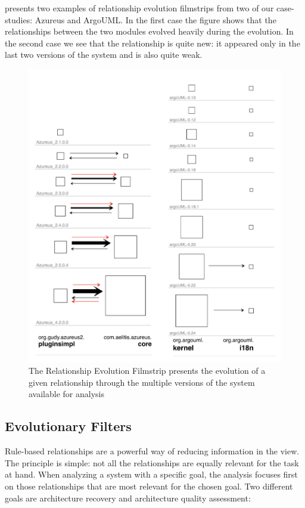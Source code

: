 \documentclass[preprint,12pt]{elsarticle}
\begin{document}
 presents two examples of relationship evolution filmstrips from two of our case-studies: Azureus and ArgoUML. In the first case the figure shows that the relationships between the two modules evolved heavily during the evolution. In the second case we see that the relationship is quite new: it appeared only in the last two versions of the system and is also quite weak.

\begin{figure}[h]
\begin{center}
\includegraphics[width=0.7\linewidth]{images/Filmstrip}
\caption{The Relationship Evolution Filmstrip presents the evolution of a given relationship through the multiple versions of the system available for analysis}
\end{center}
\end{figure}

\subsection {Evolutionary Filters}

Rule-based relationships are a powerful way of reducing information in the view. The principle is simple: not all the relationships are equally relevant for the task at hand. When analyzing a system with a specific goal, the analysis focuses first on those relationships that are most relevant for the chosen goal. Two different goals are architecture recovery and architecture quality assessment: 
\end{document}
